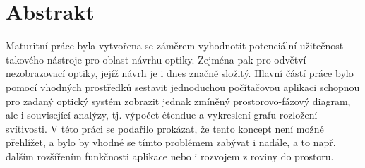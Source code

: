 \chapter*{Abstrakt}

Maturitní práce \textit{\thetitle} byla vytvořena se záměrem vyhodnotit potenciální užitečnost takového nástroje pro oblast návrhu optiky. Zejména pak pro odvětví nezobrazovací optiky, jejíž návrh je i dnes značně složitý. Hlavní částí práce bylo pomocí vhodných prostředků sestavit jednoduchou počítačovou aplikaci schopnou pro zadaný optický systém zobrazit jednak zmíněný prostorovo-fázový diagram, ale i související analýzy, tj. výpočet étendue a vykreslení grafu rozložení svítivosti. V této práci se podařilo prokázat, že tento koncept není možné přehlížet, a bylo by vhodné se tímto problémem zabývat i nadále, a to např. dalším rozšířením funkčnosti aplikace nebo i rozvojem z roviny do prostoru.
